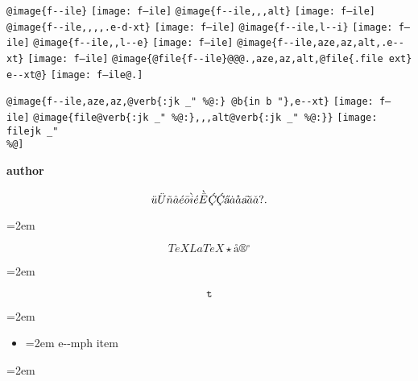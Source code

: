 \documentclass{book}
\newenvironment{GNUTexinfopreformatted}{%
  \par\begingroup\obeylines\obeyspaces\frenchspacing}{\endgroup}
\renewcommand{\includegraphics}[1]{\fbox{FIG \detokenize{#1}}}
\begin{document}
\begin{GNUTexinfopreformatted}
\texttt{@image\{f{-}{-}ile\}} \texttt{[image: f--ile]}
\texttt{@image\{f{-}{-}ile,,,alt\}} \texttt{[image: f--ile]}
\texttt{@image\{f{-}{-}ile,,,,.e-d-xt\}} \texttt{[image: f--ile]}
\texttt{@image\{f{-}{-}ile,l{-}{-}i\}} \texttt{[image: f--ile]}
\texttt{@image\{f{-}{-}ile,,l{-}{-}e\}} \texttt{[image: f--ile]}
\texttt{@image\{f{-}{-}ile,aze,az,alt,.e{-}{-}xt\}} \texttt{[image: f--ile]}
\texttt{@image\{@file\{f{-}{-}ile\}@@@.,aze,az,alt,@file\{.file ext\} e{-}{-}xt@\}} \texttt{[image: f--ile@.]}

\texttt{@image\{f{-}{-}ile,aze,az,@verb\{:jk \_" \%@:\} @b\{in b "\},e{-}{-}xt\}} \texttt{[image: f--ile]}
\texttt{@image\{file@verb\{:jk \_" \%@:\},,,alt@verb\{:jk \_" \%@:\}\}} \texttt{[image: filejk \_" \\\%@]}


{\bfseries author}%

\end{GNUTexinfopreformatted}
$$
\ddot{u} \ddot{U} \tilde{n} \hat{a} \acute{e} \bar{o} \grave{i} \acute{e} \grave{\bar{E}}
\textsl{\c{\'{C}}} \textsl{\c{\'{C}}} \textsl{\H{a}} \dot{a} \mathring{a} \textsl{\t{a}}
\breve{a} \check{a}
 ? .
$$
\begin{GNUTexinfopreformatted}
\leftskip=2em \parskip=0pt \parindent=0pt \ttfamily%

\end{GNUTexinfopreformatted}
$$
TeX LaTeX \star{} \mathord{\text{\aa{}}} \circledR{} ^{\circ{}} 
$$
\begin{GNUTexinfopreformatted}
\leftskip=2em \parskip=0pt \parindent=0pt \ttfamily%

\end{GNUTexinfopreformatted}
$$
\mathtt{t} 
$$
\begin{GNUTexinfopreformatted}
\leftskip=2em \parskip=0pt \parindent=0pt \ttfamily%

\end{GNUTexinfopreformatted}
\begin{itemize}[label=\emph{}]
\item \begin{GNUTexinfopreformatted}
\leftskip=2em \parskip=0pt \parindent=0pt \ttfamily%
e{-}{-}mph item
\end{GNUTexinfopreformatted}
\end{itemize}
\begin{GNUTexinfopreformatted}
\leftskip=2em \parskip=0pt \parindent=0pt \ttfamily%

\end{GNUTexinfopreformatted}
\end{document}

